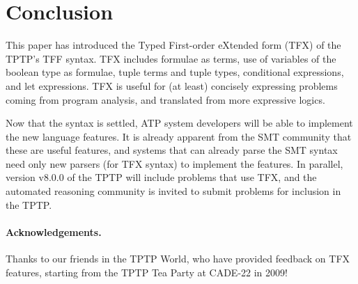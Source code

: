 \documentclass{easychair}
\begin{document}
\section{Conclusion}
\label{Conclusion}

This paper has introduced the Typed First-order eXtended form (TFX) of the
TPTP's TFF syntax.
TFX includes formulae as terms, use of variables of the boolean type as
formulae, tuple terms and tuple types, conditional expressions,
and let expressions.
TFX is useful for (at least) concisely expressing problems coming from 
program analysis, and translated from more expressive logics.

Now that the syntax is settled, ATP system developers will be able to
implement the new language features.
It is already apparent from the SMT community that these are useful features,
and systems that can already parse the SMT syntax need only new parsers (for
TFX syntax) to implement the features.
In parallel, version v8.0.0 of the TPTP will include problems that use TFX,
and the automated reasoning community is invited to submit problems for
inclusion in the TPTP.

\paragraph{Acknowledgements.}
Thanks to our friends in the TPTP World, who have provided feedback on TFX
features, starting from the TPTP Tea Party at CADE-22 in 2009!



\end{document}
